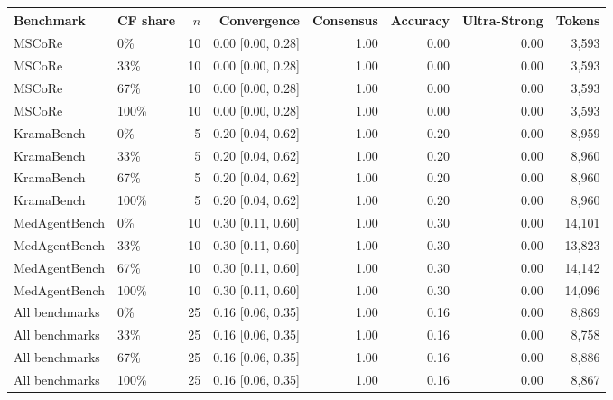 \begin{tabular}{llrrrrrr}
\toprule
Benchmark & CF share & $n$ & Convergence & Consensus & Accuracy & Ultra-Strong & Tokens \\
\midrule
MSCoRe & 0\% & 10 & 0.00 [0.00, 0.28] & 1.00 & 0.00 & 0.00 & 3,593 \\
MSCoRe & 33\% & 10 & 0.00 [0.00, 0.28] & 1.00 & 0.00 & 0.00 & 3,593 \\
MSCoRe & 67\% & 10 & 0.00 [0.00, 0.28] & 1.00 & 0.00 & 0.00 & 3,593 \\
MSCoRe & 100\% & 10 & 0.00 [0.00, 0.28] & 1.00 & 0.00 & 0.00 & 3,593 \\
\midrule
KramaBench & 0\% & 5 & 0.20 [0.04, 0.62] & 1.00 & 0.20 & 0.00 & 8,959 \\
KramaBench & 33\% & 5 & 0.20 [0.04, 0.62] & 1.00 & 0.20 & 0.00 & 8,960 \\
KramaBench & 67\% & 5 & 0.20 [0.04, 0.62] & 1.00 & 0.20 & 0.00 & 8,960 \\
KramaBench & 100\% & 5 & 0.20 [0.04, 0.62] & 1.00 & 0.20 & 0.00 & 8,960 \\
\midrule
MedAgentBench & 0\% & 10 & 0.30 [0.11, 0.60] & 1.00 & 0.30 & 0.00 & 14,101 \\
MedAgentBench & 33\% & 10 & 0.30 [0.11, 0.60] & 1.00 & 0.30 & 0.00 & 13,823 \\
MedAgentBench & 67\% & 10 & 0.30 [0.11, 0.60] & 1.00 & 0.30 & 0.00 & 14,142 \\
MedAgentBench & 100\% & 10 & 0.30 [0.11, 0.60] & 1.00 & 0.30 & 0.00 & 14,096 \\
\midrule
All benchmarks & 0\% & 25 & 0.16 [0.06, 0.35] & 1.00 & 0.16 & 0.00 & 8,869 \\
All benchmarks & 33\% & 25 & 0.16 [0.06, 0.35] & 1.00 & 0.16 & 0.00 & 8,758 \\
All benchmarks & 67\% & 25 & 0.16 [0.06, 0.35] & 1.00 & 0.16 & 0.00 & 8,886 \\
All benchmarks & 100\% & 25 & 0.16 [0.06, 0.35] & 1.00 & 0.16 & 0.00 & 8,867 \\
\bottomrule
\end{tabular}
